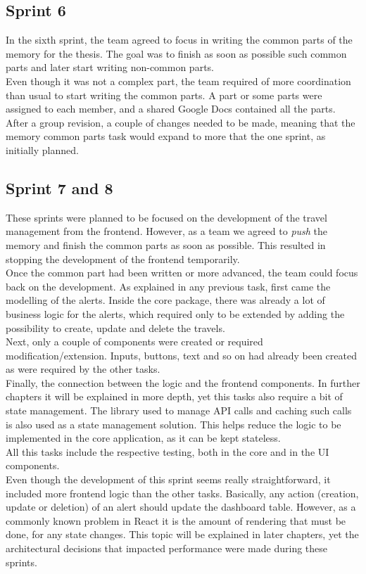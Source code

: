 \documentclass[../memory.tex]{subfiles}
\begin{document}
\subsection{Sprint 6}
In the sixth sprint, the team agreed to focus in writing the common parts of the
memory for the thesis. The goal was to finish as soon as possible such common
parts and later start writing non-common parts.
\\
Even though it was not a complex part, the team required of more coordination
than usual to start writing the common parts. A part or some parts were assigned
to each member, and a shared Google Docs contained all the parts.
\\
After a group revision, a couple of changes needed to be made, meaning that the
memory common parts task would expand to more that the one sprint, as initially
planned.
\subsection{Sprint 7 and 8}
These sprints were planned to be focused on the development of the travel
management from the frontend. However, as a team we agreed to \emph{push} the
memory and finish the common parts as soon as possible. This resulted in
stopping the development of the frontend temporarily.
\\[8pt]
Once the common part had been written or more advanced, the team could focus
back on the development. As explained in any previous task, first came the
modelling of the alerts. Inside the core package, there was already a lot of
business logic for the alerts, which required only to be extended by adding the
possibility to create, update and delete the travels.
\\
Next, only a couple of components were created or required
modification/extension. Inputs, buttons, text and so on had already been created
as were required by the other tasks.
\\
Finally, the connection between the logic and the frontend components. In
further chapters it will be explained in more depth, yet this tasks also require
a bit of state management. The library used to manage API calls and caching such
calls is also used as a state management solution. This helps reduce the logic
to be implemented in the core application, as it can be kept stateless.
\\
All this tasks include the respective testing, both in the core and in the UI
components.
\\[8pt]
Even though the development of this sprint seems really straightforward, it
included more frontend logic than the other tasks. Basically, any action
(creation, update or deletion) of an alert should update the dashboard table.
However, as a commonly known problem in React it is the amount of rendering that
must be done, for any state changes. This topic will be explained in later
chapters, yet the architectural decisions that impacted performance were made
during these sprints.
\end{document}
